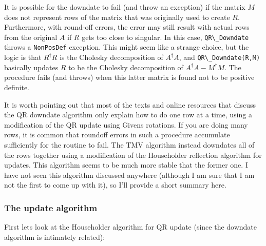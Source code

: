 \documentclass[twoside,letterpaper,11pt]{article}
\renewcommand{\tt}[1]{{\lstinline {#1}}}
\begin{document}
It is possible for the downdate to fail (and throw an exception) 
if the matrix $M$ does not represent rows
of the matrix that was originally used to create $R$.
Furthermore,
with round-off errors, the error may still result with actual rows from the 
original $A$
if $R$ gets too close to singular.  In this case, \tt{QR\_Downdate} throws
a \tt{NonPosDef} exception.  This might seem like a strange choice, but the 
logic is that $R^\dagger R$ is the Cholesky decomposition of $A^\dagger A$,
and \tt{QR\_Downdate(R,M)} basically updates $R$ to be the Cholesky decomposition
of $A^\dagger A - M^\dagger M$.  The procedure fails (and throws) when this latter 
matrix is found not to be positive definite.

It is worth pointing out that most of the texts and online resources that discuss the 
QR downdate algorithm only explain how to do one row at a time, using a 
modification of the QR update using Givens rotations.  
If you are doing many rows, it is common that roundoff errors in such a 
procedure accumulate sufficiently for the routine to fail.  The TMV algorithm
instead downdates all of the rows together using a modification of the 
Householder reflection algorithm for updates.  This algorithm seems to be
much more stable that the former one.  I have not seen this algorithm discussed
anywhere (although I am sure that I am not the first to come up with it), so
I'll provide a short summary here.

\subsubsection{The update algorithm}

First lets look at the Householder algorithm for QR update (since the downdate algorithm
is intimately related):
\end{document}
